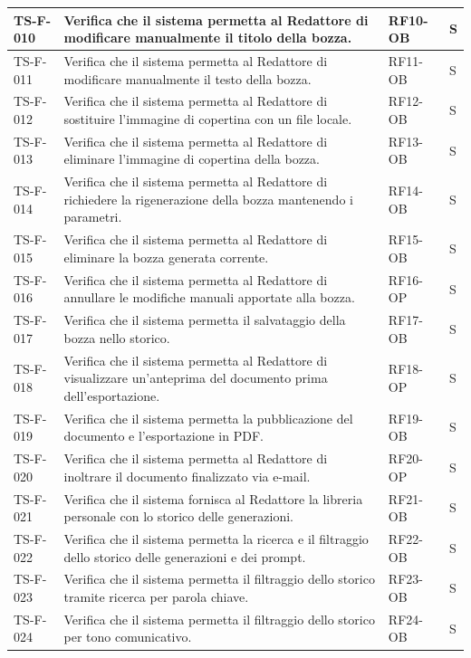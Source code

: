 \documentclass[a4paper,12pt]{article}
\begin{document}
\begin{longtable}{|p{2.2cm}|p{9.5cm}|p{2.3cm}|p{1.5cm}|}
    \hline
    TS-F-010 & Verifica che il sistema permetta al Redattore di modificare manualmente il titolo della bozza. & RF10-OB & S \\
    \hline
    TS-F-011 & Verifica che il sistema permetta al Redattore di modificare manualmente il testo della bozza. & RF11-OB & S \\
    \hline
    TS-F-012 & Verifica che il sistema permetta al Redattore di sostituire l'immagine di copertina con un file locale. & RF12-OB & S \\
    \hline
    TS-F-013 & Verifica che il sistema permetta al Redattore di eliminare l'immagine di copertina della bozza. & RF13-OB & S \\
    \hline
    TS-F-014 & Verifica che il sistema permetta al Redattore di richiedere la rigenerazione della bozza mantenendo i parametri. & RF14-OB & S \\
    \hline
    TS-F-015 & Verifica che il sistema permetta al Redattore di eliminare la bozza generata corrente. & RF15-OB & S \\
    \hline
    TS-F-016 & Verifica che il sistema permetta al Redattore di annullare le modifiche manuali apportate alla bozza. & RF16-OP & S \\
    \hline
    TS-F-017 & Verifica che il sistema permetta il salvataggio della bozza nello storico. & RF17-OB & S \\
    \hline
    TS-F-018 & Verifica che il sistema permetta al Redattore di visualizzare un'anteprima del documento prima dell'esportazione. & RF18-OP & S \\
    \hline
    TS-F-019 & Verifica che il sistema permetta la pubblicazione del documento e l'esportazione in PDF. & RF19-OB & S \\
    \hline
    TS-F-020 & Verifica che il sistema permetta al Redattore di inoltrare il documento finalizzato via e-mail. & RF20-OP & S \\
    \hline
    TS-F-021 & Verifica che il sistema fornisca al Redattore la libreria personale con lo storico delle generazioni. & RF21-OB & S \\
    \hline
    TS-F-022 & Verifica che il sistema permetta la ricerca e il filtraggio dello storico delle generazioni e dei prompt. & RF22-OB & S \\
    \hline
    TS-F-023 & Verifica che il sistema permetta il filtraggio dello storico tramite ricerca per parola chiave. & RF23-OB & S \\
    \hline
    TS-F-024 & Verifica che il sistema permetta il filtraggio dello storico per tono comunicativo. & RF24-OB & S \\

\end{longtable}
\end{document}
